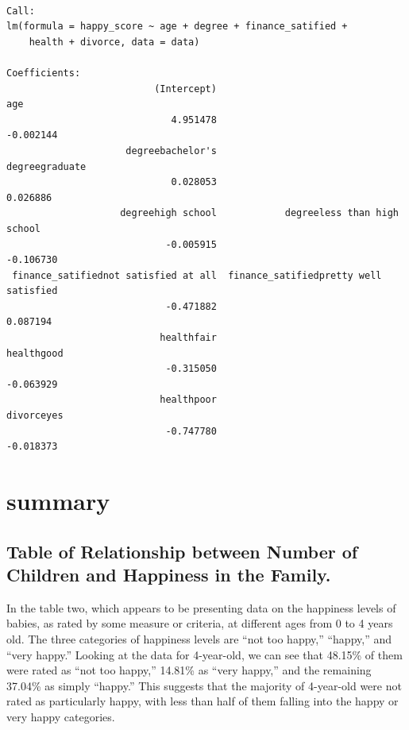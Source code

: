 \documentclass[
  letterpaper,
  DIV=11,
  numbers=noendperiod]{scrartcl}
\begin{document}
\begin{verbatim}

Call:
lm(formula = happy_score ~ age + degree + finance_satified + 
    health + divorce, data = data)

Coefficients:
                          (Intercept)                                    age  
                             4.951478                              -0.002144  
                     degreebachelor's                         degreegraduate  
                             0.028053                               0.026886  
                    degreehigh school            degreeless than high school  
                            -0.005915                              -0.106730  
 finance_satifiednot satisfied at all  finance_satifiedpretty well satisfied  
                            -0.471882                               0.087194  
                           healthfair                             healthgood  
                            -0.315050                              -0.063929  
                           healthpoor                             divorceyes  
                            -0.747780                              -0.018373  
\end{verbatim}

\hypertarget{summary}{%
\section{summary}\label{summary}}

\hypertarget{table-of-relationship-between-number-of-children-and-happiness-in-the-family.}{%
\subsection{Table of Relationship between Number of Children and
Happiness in the
Family.}\label{table-of-relationship-between-number-of-children-and-happiness-in-the-family.}}

In the table two, which appears to be presenting data on the happiness
levels of babies, as rated by some measure or criteria, at different
ages from 0 to 4 years old. The three categories of happiness levels are
``not too happy,'' ``happy,'' and ``very happy.'' Looking at the data
for 4-year-old, we can see that 48.15\% of them were rated as ``not too
happy,'' 14.81\% as ``very happy,'' and the remaining 37.04\% as simply
``happy.'' This suggests that the majority of 4-year-old were not rated
as particularly happy, with less than half of them falling into the
happy or very happy categories.
\end{document}

